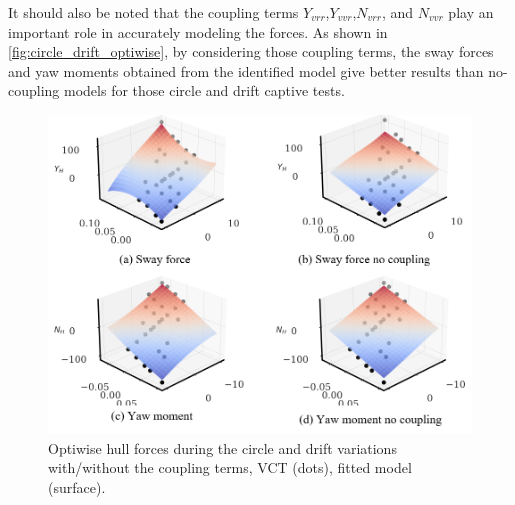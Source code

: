 \vspace{-0.5cm}
It should also be noted that the coupling terms $Y_{vrr}$,$Y_{vvr}$,$N_{vrr}$, and $N_{vvr}$ play an important role in accurately modeling the forces. As shown in \autoref{fig:circle_drift_optiwise}, by considering those coupling terms, the sway forces and yaw moments obtained from the identified model give better results than no-coupling models for those circle and drift captive tests.
\begin{figure}[ht]
    \centering
    \includegraphics[width=0.7\linewidth]{figures/results_optiwise_vct.YNH.png}
    \caption{Optiwise hull forces during the circle and drift variations with/without the coupling terms, VCT (dots), fitted model (surface).}
    \label{fig:circle_drift_optiwise}
\end{figure}
\FloatBarrier

%          
     
%          
%          
     
